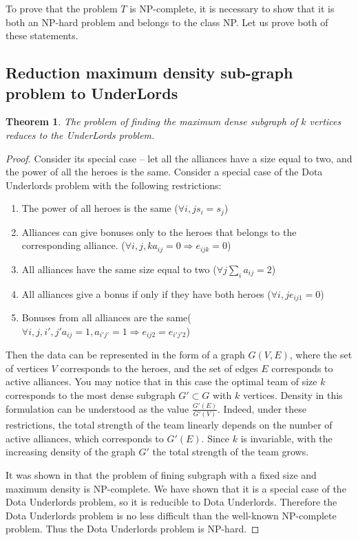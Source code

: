 \documentclass{article}
\newtheorem{theorem}{Theorem}
\begin{document}
To prove that the problem $ T $ is NP-complete, it is necessary to show that it is both an NP-hard problem and belongs to the class NP. Let us prove both of these statements.

\subsection{Reduction maximum density sub-graph problem to UnderLords}

\begin{theorem}
\label{MEWC_DU}
The problem of finding the maximum dense subgraph of $k$ vertices reduces to the UnderLords problem.
\end{theorem}
\begin{proof}

Consider its special case -- let all the alliances have a size equal to two, and the power of all the heroes is the same. Consider a special case of the Dota Underlords problem with the following restrictions:

\begin{enumerate}
    \item The power of all heroes is the same ($\forall i, j s_i=s_j$)
    \item Alliances can give bonuses only to the heroes that belongs to the corresponding alliance. ($\forall i, j, k a_{ij}=0 \Longrightarrow e_{ijk} = 0$)
    
    \item All alliances have the same size equal to two ($\forall j \sum_i a_{ij}=2$)
    \item All alliances give a bonus if only if they have both heroes ($\forall i, j e_{ij1}=0$)
    \item Bonuses from all alliances are the same($\forall i, j, i', j' a_{ij}=1, a_{i' j'}=1 \Longrightarrow e_{ij2}=e_{i' j' 2}$)
\end{enumerate}

Then the data can be represented in the form of a graph $ G (V, E) $, where the set of vertices $ V $ corresponds to the heroes, and the set of edges $ E $ corresponds to active alliances. You may notice that in this case the optimal team of size $ k $ corresponds to the most dense subgraph $ G '\subset G $ with $ k $ vertices. Density in this formulation can be understood as the value $ \frac {G '(E)} {G' (V)} $. Indeed, under these restrictions, the total strength of the team linearly depends on the number of active alliances, which corresponds to $ G '(E) $. Since $ k $ is invariable, with the increasing density of the graph $ G '$ the total strength of the team grows.

It was shown in \cite{downey1995fixed} that the problem of fining subgraph with a fixed size and maximum density is NP-complete. We have shown that it is a special case of the Dota Underlords problem, so it is reducible to Dota Underlords. Therefore the Dota Underlords problem is no less difficult than the well-known NP-complete problem. Thus the Dota Underlords problem is NP-hard.

\end{proof}
\end{document}
